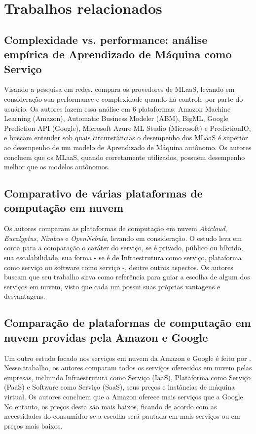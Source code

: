 \documentclass{article}
\begin{document}
\section{Trabalhos relacionados}
\subsection{Complexidade vs. performance: análise empírica de Aprendizado de Máquina como Serviço}
Visando a pesquisa em redes, \cite{yao2017} compara os provedores de MLaaS, levando em consideração sua performance e complexidade quando há controle por parte do usuário. Os autores fazem essa análise em 6 plataformas: Amazon Machine Learning (Amazon), Automatic Business Modeler (ABM), BigML, Google Prediction API (Google), Microsoft Azure ML Studio (Microsoft) e PredictionIO, e buscam entender sob quais circunstâncias o desempenho dos MLaaS é superior ao desempenho de um modelo de Aprendizado de Máquina autônomo. Os autores concluem que os MLaaS, quando corretamente utilizados, possuem desempenho melhor que os modelos autônomos. 

\subsection{Comparativo de várias plataformas de computação em nuvem}
Os autores \cite{peng2009comparison} comparam as plataformas de computação em nuvem \textit{Abicloud}, \textit{Eucalyptus}, \textit{Nimbus} e \textit{OpenNebula}, levando em consideração. O estudo leva em conta para a comparação o caráter do serviço, se é privado, público ou híbrido, sua escalabilidade, sua forma - se é de Infraestrutura como serviço, plataforma como serviço ou software como serviço -, dentre outros aspectos. Os autores buscam que seu trabalho sirva como referência para guiar a escolha de algum dos serviços em nuvem, visto que cada um possui suas próprias vantagens e desvantagens.

\subsection{Comparação de plataformas de computação em nuvem providas pela Amazon e Google}
Um outro estudo focado nos serviços em nuvem da Amazon e Google é feito por \cite{hyseni2017comparison}. Nesse trabalho, os autores comparam todos os serviços oferecidos em nuvem pelas empresas, incluindo Infraestrutura como Serviço (IaaS), Plataforma como Serviço (PaaS) e Software como Serviço (SaaS), seus preços e instâncias de máquina virtual. Os autores concluem que a Amazon oferece mais serviços que a Google. No entanto, os preços desta são mais baixos, ficando de acordo com as necessidades do consumidor se a escolha será pautada em mais serviços ou em preços mais baixos.
\end{document}
